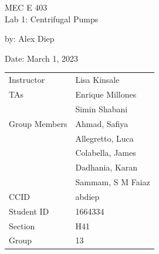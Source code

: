 \documentclass[letterpaper,12pt]{article} %
\begin{document}
\begin{titlepage}
    \centering
    \vspace*{2cm} %
    
    \Huge {MEC E 403 \\Lab 1: Centrifugal Pumps} \\
    \vspace{1cm} %
    
    \Large by: Alex Diep \\
    \vspace{1cm} %

    \Large Date: March 1, 2023 \\ %
    \vspace{2cm} %




    \begin{table}[h]
        \centering
        \begin{tabular}{ll}
            Instructor & Lisa Kinsale \\
            TAs & Enrique Millones \\
            & Simin Shabani \vspace{0.5cm} \\
            Group Members & Ahmad, Safiya \\
            & Allegretto, Luca \\
            & Colabella, James \\
            & Dadhania, Karan \\
            & Sammam, S M Faiaz \vspace{0.5cm} \\
            CCID & abdiep \\
            Student ID & 1664334 \\
            Section & H41 \\
            Group & 13 \\
        \end{tabular}
    \end{table}
      

\end{titlepage}
\end{document}
